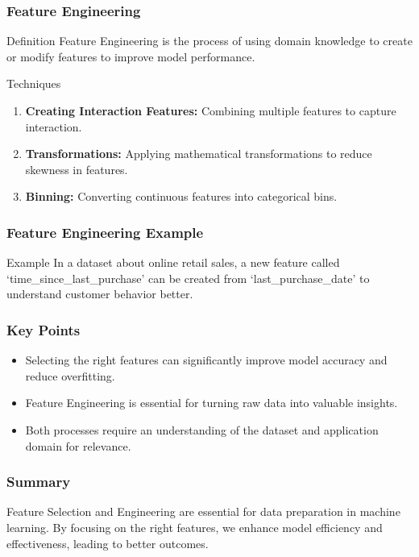 \documentclass[aspectratio=169]{beamer}
\begin{document}
\begin{frame}[fragile]
    \frametitle{Feature Engineering}
    \begin{block}{Definition}
        Feature Engineering is the process of using domain knowledge to create or modify features to improve model performance.
    \end{block}

    \begin{block}{Techniques}
        \begin{enumerate}
            \item \textbf{Creating Interaction Features:} Combining multiple features to capture interaction.
            \item \textbf{Transformations:} Applying mathematical transformations to reduce skewness in features.
            \item \textbf{Binning:} Converting continuous features into categorical bins.
        \end{enumerate}
    \end{block}
\end{frame}

\begin{frame}[fragile]
    \frametitle{Feature Engineering Example}
    \begin{block}{Example}
        In a dataset about online retail sales, a new feature called ‘time\_since\_last\_purchase’ can be created 
        from ‘last\_purchase\_date’ to understand customer behavior better.
    \end{block}
\end{frame}

\begin{frame}[fragile]
    \frametitle{Key Points}
    \begin{itemize}
        \item Selecting the right features can significantly improve model accuracy and reduce overfitting.
        \item Feature Engineering is essential for turning raw data into valuable insights.
        \item Both processes require an understanding of the dataset and application domain for relevance.
    \end{itemize}
\end{frame}

\begin{frame}[fragile]
    \frametitle{Summary}
    Feature Selection and Engineering are essential for data preparation in machine learning. By focusing on the 
    right features, we enhance model efficiency and effectiveness, leading to better outcomes.
\end{frame}
\end{document}

